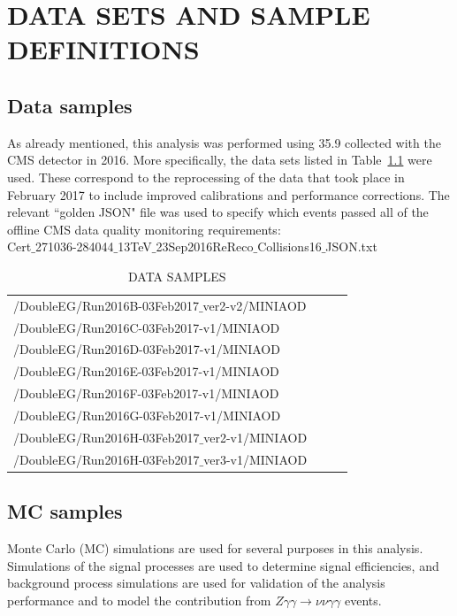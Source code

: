 \chapter{DATA SETS AND SAMPLE DEFINITIONS}
\label{chap:EventSelect}

\section{Data samples}

As already mentioned, this analysis was performed using 35.9 \fbinv collected with the CMS detector in 2016. More specifically, the data sets listed in Table~\ref{tab:datasets} were used. These correspond to the reprocessing of the data that took place in February 2017 to include improved calibrations and performance corrections. The relevant ``golden JSON" file was used to specify which events passed all of the offline CMS data quality monitoring requirements: \\
Cert$\_$271036-284044$\_$13TeV$\_$23Sep2016ReReco$\_$Collisions16$\_$JSON.txt

\begin{table}[ht]
\caption{DATA SAMPLES}
\label{tab:datasets}
\begin{center}
\begin{tabular}{|>{\centering\arraybackslash}m{0.9\linewidth}|}
\hline
\hline
/DoubleEG/Run2016B-03Feb2017$\_$ver2-v2/MINIAOD \\
/DoubleEG/Run2016C-03Feb2017-v1/MINIAOD \\
/DoubleEG/Run2016D-03Feb2017-v1/MINIAOD \\
/DoubleEG/Run2016E-03Feb2017-v1/MINIAOD \\
/DoubleEG/Run2016F-03Feb2017-v1/MINIAOD \\
/DoubleEG/Run2016G-03Feb2017-v1/MINIAOD \\
/DoubleEG/Run2016H-03Feb2017$\_$ver2-v1/MINIAOD \\
/DoubleEG/Run2016H-03Feb2017$\_$ver3-v1/MINIAOD \\      
\hline
\hline
\end{tabular}
\end{center}
\end{table}

\section{MC samples}
\label{sec:MC}
Monte Carlo (MC) simulations are used for several purposes in this analysis. Simulations
of the signal processes are used to determine signal efficiencies, and
background process simulations are used for validation of the analysis performance
and to model the contribution from $Z\gamma\gamma\rightarrow\nu\nu\gamma\gamma$
events. 

